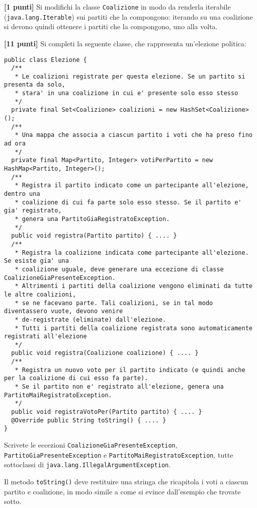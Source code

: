 \documentclass{article}[10pt]
\newcounter{esnu}
\newenvironment{esercizio}{\medskip \noindent {\bf Esercizio\addtocounter{esnu}{1} \arabic{esnu}}}{}
\begin{document}
\begin{esercizio}
\textbf{[1 punti]}
Si modifichi la classe \texttt{Coalizione} in modo da renderla iterabile
(\texttt{java.lang.Iterable}) sui partiti che la compongono: iterando su una coalizione
si devono quindi ottenere i partiti che la compongono, uno alla volta.
\end{esercizio}

\begin{esercizio}
\textbf{[11 punti]}
Si completi la seguente classe, che rappresenta un'elezione politica:
%
{\small
\begin{verbatim}
public class Elezione {
  /**
   * Le coalizioni registrate per questa elezione. Se un partito si presenta da solo,
   * stara' in una coalizione in cui e' presente solo esso stesso
   */
  private final Set<Coalizione> coalizioni = new HashSet<Coalizione>();
  /**
   * Una mappa che associa a ciascun partito i voti che ha preso fino ad ora
   */
  private final Map<Partito, Integer> votiPerPartito = new HashMap<Partito, Integer>();
  /**
   * Registra il partito indicato come un partecipante all'elezione, dentro una
   * coalizione di cui fa parte solo esso stesso. Se il partito e' gia' registrato,
   * genera una PartitoGiaRegistratoException.
   */
  public void registra(Partito partito) { .... }
  /**
   * Registra la coalizione indicata come partecipante all'elezione. Se esiste gia' una
   * coalizione uguale, deve generare una eccezione di classe CoalizioneGiaPresenteException.
   * Altrimenti i partiti della coalizione vengono eliminati da tutte le altre coalizioni,
   * se ne facevano parte. Tali coalizioni, se in tal modo diventassero vuote, devono venire
   * de-registrate (eliminate) dall'elezione.
   * Tutti i partiti della coalizione registrata sono automaticamente registrati all'elezione
   */
  public void registra(Coalizione coalizione) { .... }
  /**
   * Registra un nuovo voto per il partito indicato (e quindi anche per la coalizione di cui esso fa parte).
   * Se il partito non e' registrato all'elezione, genera una PartitoMaiRegistratoException.
   */
  public void registraVotoPer(Partito partito) { .... }
  @Override public String toString() { .... }
}
\end{verbatim}}

\noindent
Scrivete le eccezioni \texttt{CoalizioneGiaPresenteException},
\texttt{PartitoGiaPresenteException} e \texttt{PartitoMaiRegistratoException}, tutte sottoclassi
di \texttt{java.lang.IllegalArgumentException}.

Il metodo \texttt{toString()} deve restituire una stringa che ricapitola i voti a ciascun
partito e coalizione, in modo simile a come si evince dall'esempio che trovate sotto.
\end{esercizio}
\end{document}
